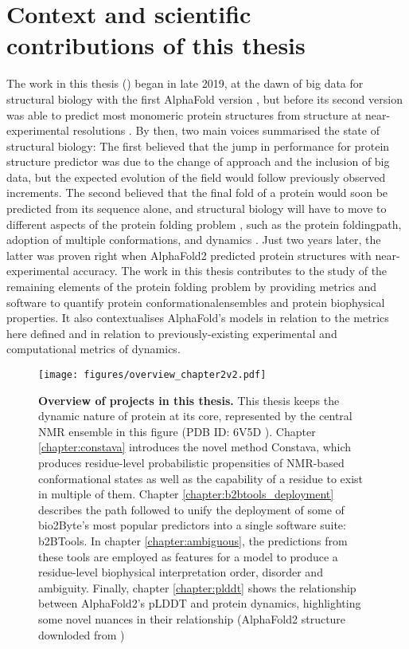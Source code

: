 \chapter{Context and scientific contributions of this thesis}\label{chapter:contributions}
\newpage
\mbox{}
\newpage

The work in this thesis () began in late 2019, at the dawn of big data for structural biology with the first AlphaFold version \cite{senior_improved_2020}, but before its second version was able to predict most monomeric protein structures from structure at near-experimental resolutions \cite{jumper_highly_2021}. By then, two main voices summarised the state of structural biology: The first believed that the jump in performance for protein structure predictor was due to the change of approach and the inclusion of big data, but the expected evolution of the field would follow previously observed increments. The second believed that the final fold of a protein would soon be predicted from its sequence alone, and structural biology will have to move to different aspects of the protein folding problem \cite{alquraishi_alphafold_2018}, such as the protein \gls{foldingpath}, adoption of multiple \glspl{conformation}, and \gls{dynamics} \cite{powers_proteome_2021}. Just two years later, the latter was proven right when AlphaFold2 predicted protein structures with near-experimental accuracy. The work in this thesis contributes to the study of the remaining elements of the protein folding problem by providing metrics and software to quantify protein \glspl{conformationalensemble} and protein biophysical properties. It also contextualises AlphaFold's models in relation to the metrics here defined and in relation to previously-existing experimental and computational metrics of \gls{dynamics}.

\begin{figure}[tbh!]
    \centering
    \texttt{[image: figures/overview\_chapter2v2.pdf]}
    \caption{\textbf{Overview of projects in this thesis.}
    This thesis keeps the dynamic nature of protein at its core, represented by the central NMR ensemble in this figure (PDB ID: 6V5D \cite{smith_enhancing_2020}). Chapter \ref{chapter:constava} introduces the novel method Constava, which produces residue-level probabilistic propensities of NMR-based conformational states as well as the capability of a residue to exist in multiple of them. Chapter \ref{chapter:b2btools_deployment} describes the path followed to unify the deployment of some of bio2Byte's most popular predictors into a single software suite: b2BTools. In chapter \ref{chapter:ambiguous}, the predictions from these tools are employed as features for a model to produce a residue-level biophysical interpretation order, disorder and ambiguity. Finally, chapter \ref{chapter:plddt} shows the relationship between AlphaFold2's pLDDT and protein dynamics, highlighting some novel nuances in their relationship (AlphaFold2 structure downloded from ) 
    }
    \label{fig:chapter2:overview}
\end{figure}

